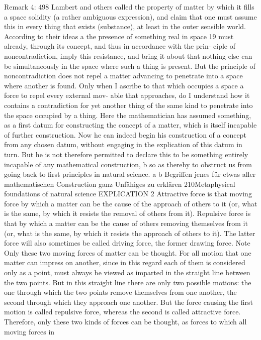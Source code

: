 Remark
4: 498
Lambert and others called the property of matter by which it ﬁlls a space
solidity (a rather ambiguous expression), and claim that one must assume
this in every thing that exists (substance), at least in the outer sensible
world. According to their ideas a the presence of something real in space 19
must already, through its concept, and thus in accordance with the prin-
ciple of noncontradiction, imply this resistance, and bring it about that
nothing else can be simultaneously in the space where such a thing is
present. But the principle of noncontradiction does not repel a matter
advancing to penetrate into a space where another is found. Only when I
ascribe to that which occupies a space a force to repel every external mov-
able that approaches, do I understand how it contains a contradiction for
yet another thing of the same kind to penetrate into the space occupied
by a thing. Here the mathematician has assumed something, as a ﬁrst
datum for constructing the concept of a matter, which is itself incapable
of further construction. Now he can indeed begin his construction of a
concept from any chosen datum, without engaging in the explication of
this datum in turn. But he is not therefore permitted to declare this to
be something entirely incapable of any mathematical construction, b so
as thereby to obstruct us from going back to ﬁrst principles in natural
science.
a
b
Begriffen
jenes für etwas aller mathematischen Construction ganz Unfähiges zu erklären
210Metaphysical foundations of natural science
EXPLICATION 2
Attractive force is that moving force by which a matter can be the cause
of the approach of others to it (or, what is the same, by which it resists
the removal of others from it).
Repulsive force is that by which a matter can be the cause of others
removing themselves from it (or, what is the same, by which it resists the
approach of others to it). The latter force will also sometimes be called
driving force, the former drawing force.
Note
Only these two moving forces of matter can be thought. For all motion
that one matter can impress on another, since in this regard each of them
is considered only as a point, must always be viewed as imparted in the
straight line between the two points. But in this straight line there are
only two possible motions: the one through which the two points remove
themselves from one another, the second through which they approach
one another. But the force causing the ﬁrst motion is called repulsive force,
whereas the second is called attractive force. Therefore, only these two
kinds of forces can be thought, as forces to which all moving forces in
